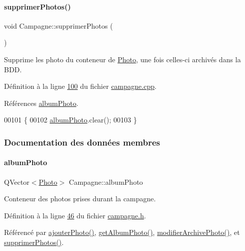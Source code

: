 \paragraph{\texorpdfstring{supprimer\+Photos()}{supprimerPhotos()}}
{\footnotesize\ttfamily void Campagne\+::supprimer\+Photos (\begin{DoxyParamCaption}{ }\end{DoxyParamCaption})}



Supprime les photo du conteneur de \hyperlink{struct_photo}{Photo}, une fois celles-\/ci archivés dans la B\+DD. 



Définition à la ligne \hyperlink{campagne_8cpp_source_l00100}{100} du fichier \hyperlink{campagne_8cpp_source}{campagne.\+cpp}.



Références \hyperlink{campagne_8h_source_l00046}{album\+Photo}.


\begin{DoxyCode}
00101 \{
00102     \hyperlink{class_campagne_a4d1fc7d4dbf10868a297fe3df7f08dbf}{albumPhoto}.clear();
00103 \}
\end{DoxyCode}


\subsubsection{Documentation des données membres}
\mbox{\label{class_campagne_a4d1fc7d4dbf10868a297fe3df7f08dbf}} 
\paragraph{\texorpdfstring{album\+Photo}{albumPhoto}}
{\footnotesize\ttfamily Q\+Vector$<$\hyperlink{struct_photo}{Photo}$>$ Campagne\+::album\+Photo\hspace{0.3cm}{\ttfamily [private]}}



Conteneur des photos prises durant la campagne. 



Définition à la ligne \hyperlink{campagne_8h_source_l00046}{46} du fichier \hyperlink{campagne_8h_source}{campagne.\+h}.



Référencé par \hyperlink{campagne_8cpp_source_l00080}{ajouter\+Photo()}, \hyperlink{campagne_8cpp_source_l00070}{get\+Album\+Photo()}, \hyperlink{campagne_8cpp_source_l00085}{modifier\+Archive\+Photo()}, et \hyperlink{campagne_8cpp_source_l00100}{supprimer\+Photos()}.

